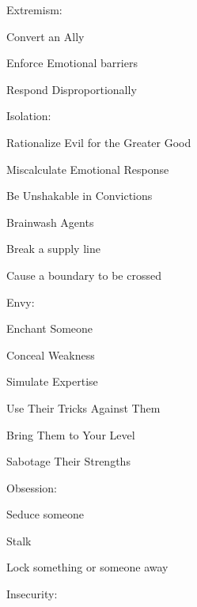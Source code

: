 \documentclass[
  oneside,
  statementpaper,
  9pt]{memoir}
\begin{document}
\begin{MC}
\begin{itemize*}
\end{itemize*}

Extremism:

\begin{itemize*}

\item Convert an Ally 
\item Enforce Emotional barriers 
\item Respond Disproportionally

\end{itemize*}

Isolation:

\begin{itemize*}

\item Rationalize Evil for the Greater Good 
\item Miscalculate Emotional Response 
\item Be Unshakable in Convictions 
\item Brainwash Agents 
\item Break a supply line 
\item Cause a boundary to be crossed 

\end{itemize*}

Envy:

\begin{itemize*}

\item Enchant Someone 
\item Conceal Weakness 
\item Simulate Expertise 
\item Use Their Tricks Against Them 
\item Bring Them to Your Level 
\item Sabotage Their Strengths

\end{itemize*}

Obsession:

\begin{itemize*}

\item Seduce someone 
\item Stalk 
\item Lock something or someone away

\end{itemize*}

Insecurity:

\begin{itemize*}


\end{itemize*}
\end{MC}
\end{document}
